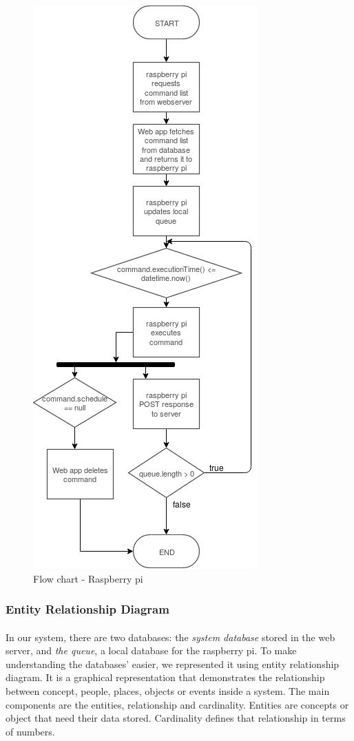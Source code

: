 \documentclass[12pt, oneside, a4paper]{book}
\begin{document}
				\begin{figure}[H]
					\centering
					\caption{Flow chart - Raspberry pi}
					\label{fig:ig:flow_rasp}
					\includegraphics[width=.65\linewidth]{img/flowchart_raspberry.png}
				\end{figure}
				\newpage\subsubsection{Entity Relationship Diagram}
					\paragraph{} In our system, there are two databases: the \textit{system database} stored in the web server, and \textit{the queue}, a local database for the raspberry pi. To make understanding the databases' easier, we represented it using entity relationship diagram. It is a graphical representation that demonstrates the relationship between concept, people, places, objects or events inside a system. The main components are the entities, relationship and cardinality. Entities are concepts or object that need their data stored. Cardinality defines that relationship in terms of numbers\cite{erd}.
				
\end{document}
